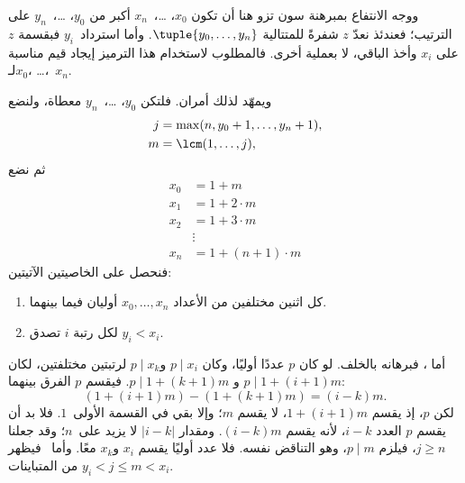 \documentclass[../../../include/open-logic-section]{subfiles}
\begin{document}
ووجه الانتفاع بمبرهنة سون تزو هنا أن تكون $x_0$، \dots،~$x_n$
أكبر من $y_0$، \dots،~$y_n$ على الترتيب؛ فعندئذ نعدّ $z$
شفرةً للمتتالية $\tuple{y_0,\dots,y_n}$. وأما استرداد~$y_i$
فبقسمة $z$ على $x_i$ وأخذ الباقي، لا بعملية أخرى.
فالمطلوب لاستخدام هذا الترميز إيجاد قيم مناسبة لـ$x_0$، \dots،~$x_n$.

ويمهّد لذلك أمران. فلتكن $y_0$، \dots،~$y_n$ معطاة، ولنضع
\begin{align*}
j &= \max(n, y_0 + 1, \dots, y_n + 1), \\
m &= \lcm(1,\dots,j),
\end{align*}
ثم نضع
\begin{align*}
x_0 & = 1 + m \\
x_1 & = 1 + 2 \cdot m \\
x_2 & = 1 + 3 \cdot m \\
& \vdots  \\
x_n & = 1 + (n+1) \cdot m
\end{align*}
فنحصل على الخاصيتين الآتيتين:
\begin{enumerate}
\item{} كل اثنين مختلفين من الأعداد $x_0,\dots,x_n$ أوليان فيما بينهما.
\item{} لكل رتبة $i$ تصدق $y_i<x_i$.
\end{enumerate}
أما ، فبرهانه بالخلف. لو كان $p$ عددًا أوليًا، وكان
$p\mid x_i$ و$p\mid x_k$ لرتبتين مختلفتين، لكان $p\mid1+(i+1)m$ و
$p\mid1+(k+1)m$. فيقسم $p$ الفرق بينهما:
\[
(1 + (i+1)m) - (1+ (k+1)m) = (i-k) m.
\]
لكن $p$، إذ يقسم $1+(i+1)m$، لا يقسم $m$؛ وإلا بقي في القسمة
الأولى~$1$. فلا بد أن يقسم $p$ العدد $i-k$، لأنه يقسم
$(i-k)m$. ومقدار $\left|i-k\right|$ لا يزيد على~$n$؛ وقد جعلنا
$j\geq n$، فيلزم $p\mid m$، وهو التناقض نفسه.
فلا عدد أوليًا يقسم $x_i$ و$x_k$ معًا.
وأما~ فيظهر من المتباينات $y_i<j\leq m<x_i$.
\end{document}
